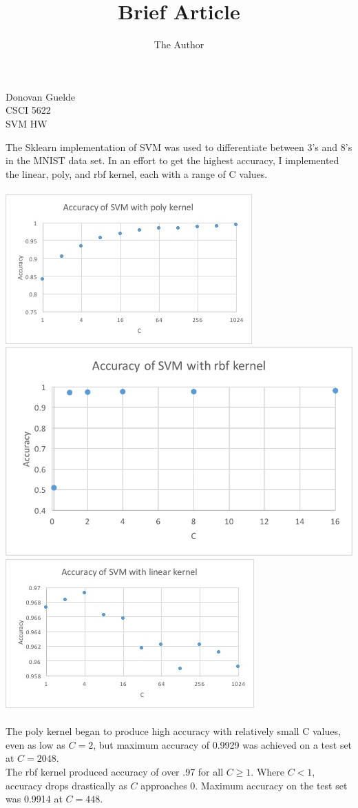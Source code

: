 \documentclass[11pt, oneside]{article}   	%
\title{Brief Article}
\author{The Author}
\begin{document}
\begin{flushright}
Donovan Guelde\\
CSCI 5622\\
SVM HW\\
\end{flushright}
\indent The Sklearn implementation of SVM was used to differentiate between 3's and 8's in the MNIST data set.  In an effort to get the highest accuracy, I implemented the linear, poly, and rbf kernel, each with a range of C values.\\
\\
\includegraphics[width= .3\textwidth]{poly}
\includegraphics[width=.3\textwidth]{rbf}
\includegraphics[width=.3\textwidth]{linear}\\
\\
\indent The poly kernel began to produce high accuracy with relatively small C values, even as low as $C = 2$, but maximum accuracy of 0.9929 was achieved on a test set at $C = 2048$.\\
\indent The rbf kernel produced accuracy of over .97 for all $C \geq 1$.  Where $C < 1$, accuracy drops drastically as $C$ approaches 0.  Maximum accuracy on the test set was 0.9914 at $C = 448$.\\
\end{document}
